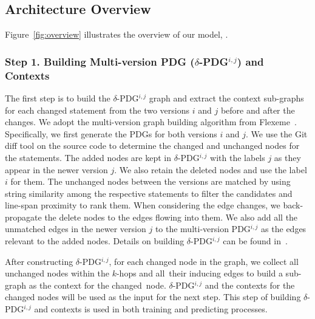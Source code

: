 \subsection{Architecture Overview}
\label{arch-overview:sec}


Figure~\ref{fig:overview} illustrates the overview of our model, {\tool}.

\subsubsection{{\bf Step 1. Building Multi-version PDG ($\delta$-PDG$^{i,j}$) and Contexts}}
The first step is to build the $\delta$-PDG$^{i,j}$ graph and extract
the context sub-graphs for each changed statement from the two
versions $i$ and $j$ before and after the changes. We adopt the
multi-version graph building algorithm from
Flexeme~\cite{flexeme-fse20}. Specifically, we first generate the PDGs
for both versions $i$ and $j$. We use the Git diff tool on the source
code to determine the changed and unchanged nodes for the
statements. The added nodes are kept in $\delta$-PDG$^{i,j}$ with the
labels $j$ as they appear in the newer version $j$. We also retain the
deleted nodes and use the label $i$ for them. The unchanged nodes
between the versions are matched by using string similarity among the
respective statements to filter the candidates and line-span proximity
to rank them. When considering the edge changes, we back-propagate the
delete nodes to the edges flowing into them. We also add all the unmatched
edges in the newer version $j$ to the multi-version PDG$^{i,j}$ as the
edges relevant to the added nodes. Details on building
$\delta$-PDG$^{i,j}$ can be found in~\cite{flexeme-fse20}.

After constructing $\delta$-PDG$^{i,j}$, for each changed node in the
graph, we collect all unchanged nodes within the $k$-hops and
all~their inducing edges to build a sub-graph as the context for the
changed~node. 
$\delta$-PDG$^{i,j}$ and the contexts for the changed nodes
will be used as the input for the next step.
This step of building $\delta$-PDG$^{i,j}$ and contexts is used in
both training and predicting processes.

